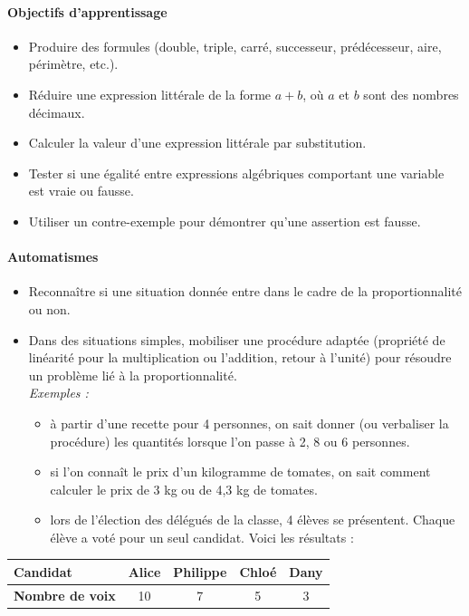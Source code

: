 \documentclass[11pt,a4paper]{article}
\begin{document}
\paragraph{Objectifs d'apprentissage}
\begin{itemize}[label=\bullet]
    \item Produire des formules (double, triple, carré, successeur, prédécesseur, aire, périmètre, etc.).
    \item Réduire une expression littérale de la forme $a + b$, où $a$ et $b$ sont des nombres décimaux.
    \item Calculer la valeur d'une expression littérale par substitution.
    \item Tester si une égalité entre expressions algébriques comportant une variable est vraie ou fausse.
    \item Utiliser un contre-exemple pour démontrer qu'une assertion est fausse.
\end{itemize}

\paragraph{Automatismes}
\begin{itemize}[label=\bullet]
    \item Reconnaître si une situation donnée entre dans le cadre de la proportionnalité ou non.
    \item Dans des situations simples, mobiliser une procédure adaptée (propriété de linéarité pour la multiplication ou l'addition, retour à l'unité) pour résoudre un problème lié à la proportionnalité.\\
    \textit{Exemples :}
    \begin{itemize}[label=-]
        \item à partir d'une recette pour 4 personnes, on sait donner (ou verbaliser la procédure) les quantités lorsque l'on passe à 2, 8 ou 6 personnes.
        \item si l'on connaît le prix d'un kilogramme de tomates, on sait comment calculer le prix de 3 kg ou de 4,3 kg de tomates.
        \item lors de l'élection des délégués de la classe, 4 élèves se présentent. Chaque élève a voté pour un seul candidat. Voici les résultats :
    \end{itemize}
\end{itemize}

\begin{center}
\begin{tabular}{lcccc}
    \toprule
    \textbf{Candidat} & Alice & Philippe & Chloé & Dany \\
    \midrule
    \textbf{Nombre de voix} & 10 & 7 & 5 & 3 \\
    \bottomrule
\end{tabular}
\end{center}
\end{document}
